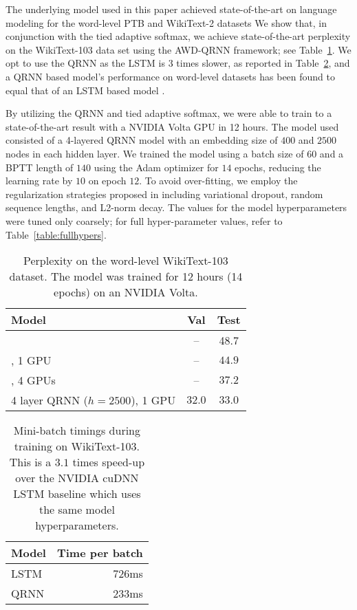 \documentclass{article}
\begin{document}
The underlying model used in this paper achieved state-of-the-art on language modeling for the word-level PTB and WikiText-2 datasets \cite{merity2018regularizing}
We show that, in conjunction with the tied adaptive softmax, we achieve state-of-the-art perplexity on the WikiText-103 data set using the AWD-QRNN framework; see Table~\ref{table:wikitext103}.
We opt to use the QRNN as the LSTM is 3 times slower, as reported in Table~\ref{table:wt103time}, and a QRNN based model's performance on word-level datasets has been found to equal that of an LSTM based model \citet{merity2018regularizing}.

By utilizing the QRNN and tied adaptive softmax, we were able to train to a state-of-the-art result with a NVIDIA Volta GPU in 12 hours.
The model used consisted of a 4-layered QRNN model with an embedding size of $400$ and $2500$ nodes in each hidden layer.
We trained the model using a batch size of $60$ and a BPTT length of $140$ using the Adam optimizer \cite{kingma2014adam} for $14$ epochs, reducing the learning rate by $10$ on epoch $12$.
To avoid over-fitting, we employ the regularization strategies proposed in \cite{merity2018regularizing} including variational dropout, random sequence lengths, and L2-norm decay.
The values for the model hyperparameters were tuned only coarsely; for full hyper-parameter values, refer to Table~\ref{table:fullhypers}.

\begin{table}[t]
\centering
\begin{tabular}{l|cc}
\toprule
\bf Model & \bf Val &  \bf Test \\
\midrule
\citet{Grave2016} & -- & 48.7 \\
\citet{dauphin2016language}, 1 GPU & -- & $44.9$ \\
\citet{dauphin2016language}, 4 GPUs & -- & $37.2$ \\
\midrule
4 layer QRNN ($h=2500$), 1 GPU & $32.0$ & $33.0$ \\
\bottomrule
\end{tabular}
\caption{Perplexity on the word-level WikiText-103 dataset.
The model was trained for 12 hours (14 epochs) on an NVIDIA Volta.
\label{table:wikitext103}
}
\end{table}

\begin{table}[t]
\centering
\begin{tabular}{l|r}
\toprule
\bf Model & \bf Time per batch \\
\midrule
LSTM & 726ms \\
QRNN & 233ms \\
\bottomrule
\end{tabular}
\caption{Mini-batch timings during training on WikiText-103.
This is a $3.1$ times speed-up over the NVIDIA cuDNN LSTM baseline which uses the same model hyperparameters.
\label{table:wt103time}}
\end{table}
\end{document}
